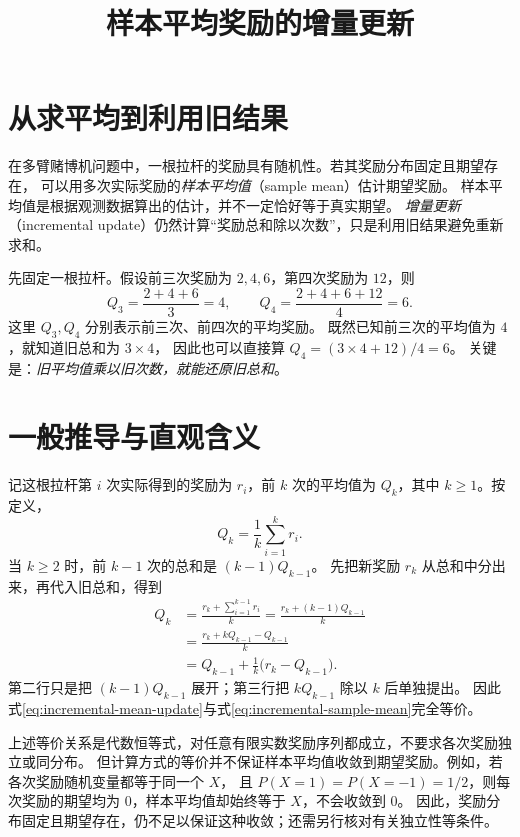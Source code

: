 \documentclass[UTF8,12pt,a4paper,fontset=fandol]{ctexart}
\title{样本平均奖励的增量更新}
\author{}
\date{}
\begin{document}
\maketitle

\section{从求平均到利用旧结果}
\label{sec:incremental-mean-example}

在多臂赌博机问题中，一根拉杆的奖励具有随机性。若其奖励分布固定且期望存在，
可以用多次实际奖励的\emph{样本平均值}（sample mean）估计期望奖励。
样本平均值是根据观测数据算出的估计，并不一定恰好等于真实期望。
\emph{增量更新}（incremental update）仍然计算“奖励总和除以次数”，只是利用旧结果避免重新求和。

先固定一根拉杆。假设前三次奖励为 $2,4,6$，第四次奖励为 $12$，则
\[
  Q_3=\frac{2+4+6}{3}=4,
  \qquad
  Q_4=\frac{2+4+6+12}{4}=6.
\]
这里 $Q_3,Q_4$ 分别表示前三次、前四次的平均奖励。
既然已知前三次的平均值为 $4$，就知道旧总和为 $3\times4$，
因此也可以直接算 $Q_4=(3\times4+12)/4=6$。
关键是：\emph{旧平均值乘以旧次数，就能还原旧总和}。

\section{一般推导与直观含义}
\label{sec:incremental-mean-derivation}

记这根拉杆第 $i$ 次实际得到的奖励为 $r_i$，前 $k$ 次的平均值为 $Q_k$，其中 $k\geq1$。按定义，
\begin{equation}
  Q_k=\frac{1}{k}\sum_{i=1}^{k}r_i.
  \label{eq:incremental-sample-mean}
\end{equation}
当 $k\geq2$ 时，前 $k-1$ 次的总和是 $(k-1)Q_{k-1}$。
先把新奖励 $r_k$ 从总和中分出来，再代入旧总和，得到
\begin{equation}
  \begin{aligned}
    Q_k
    &=\frac{r_k+\sum_{i=1}^{k-1}r_i}{k}
     =\frac{r_k+(k-1)Q_{k-1}}{k}\\
    &=\frac{r_k+kQ_{k-1}-Q_{k-1}}{k}\\
    &=Q_{k-1}+\frac{1}{k}\bigl(r_k-Q_{k-1}\bigr).
  \end{aligned}
  \label{eq:incremental-mean-update}
\end{equation}
第二行只是把 $(k-1)Q_{k-1}$ 展开；第三行把 $kQ_{k-1}$ 除以 $k$ 后单独提出。
因此式\eqref{eq:incremental-mean-update}与式\eqref{eq:incremental-sample-mean}完全等价。

上述等价关系是代数恒等式，对任意有限实数奖励序列都成立，不要求各次奖励独立或同分布。
但计算方式的等价并不保证样本平均值收敛到期望奖励。例如，若各次奖励随机变量都等于同一个 $X$，
且 $P(X=1)=P(X=-1)=1/2$，则每次奖励的期望均为 $0$，样本平均值却始终等于 $X$，不会收敛到 $0$。
因此，奖励分布固定且期望存在，仍不足以保证这种收敛；还需另行核对有关独立性等条件。
\end{document}
